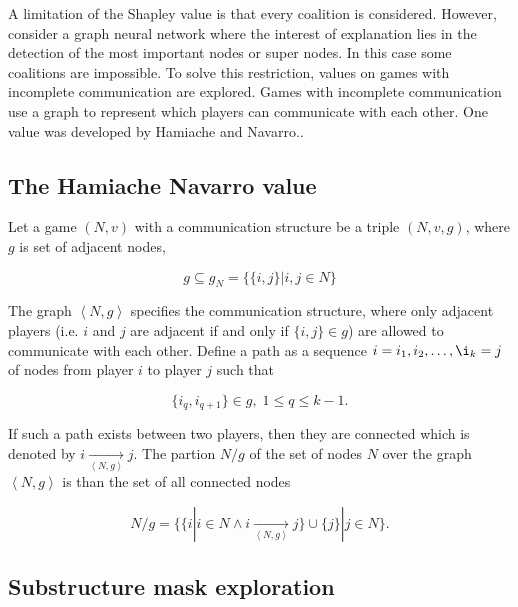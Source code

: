 \documentclass[twoside,twocolumn,9pt]{article}
\begin{document}
A limitation of the Shapley value is that every coalition is considered.\cite{zhang2022gstarx} 
However, consider a graph neural network where the interest of explanation lies in the detection 
of the most important nodes or super nodes. In this case some coalitions are impossible. To solve 
this restriction, values on games with incomplete communication\cite{myerson1977graphs} are explored. 
Games with incomplete communication use a graph to represent which players can communicate with each other.
One value was developed by Hamiache and Navarro.\cite{hamiache_value_1999, hamiache_associated_2020}.

\subsection{The Hamiache Navarro value}

Let a game $(N, v)$ with a communication structure be a triple $(N, v, g)$, where $g$ is
set of adjacent nodes\cite{hamiache_value_1999},

\begin{equation}
	g \subseteq g_N = \{ \{i, j \} | i, j \in N \}
\end{equation}

The graph $\left< N, g \right>$ specifies the communication structure, where only adjacent
players (i.e. $i$ and $j$ are adjacent if and only if $\{ i, j \} \in g$) are allowed to
communicate with each other. Define a path as a sequence $i = i_1, i_2, \dots, \i_k = j$
of nodes from player $i$ to player $j$ such that

\begin{equation}
	\{i_q, i_{q+1} \} \in g, \; 1 \le q \le k - 1.
\end{equation}

If such a path exists between two players, then they are connected which is denoted by
$i \underset{\left< N, g \right>}{\rightarrow} j$.\cite{} The partion $N/g$ of the set of
nodes $N$ over the graph $\left< N, g \right>$ is than the set of all connected nodes\cite{}

\begin{equation}
N/g = \{\{ i | i \in N \land i \underset{\left<N, g \right>}{\rightarrow} j\} \cup \{j\} | j \in N \}.
\end{equation}


\subsection{Substructure mask exploration}
\end{document}
